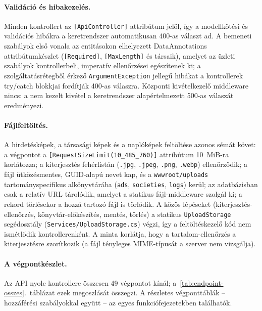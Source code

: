 \paragraph{Validáció és hibakezelés.} Minden kontrollert az \texttt{[ApiController]} attribútum
jelöl, így a modellkötési és validációs hibákra a keretrendszer automatikusan 400-as választ ad.
A bemeneti szabályok első vonala az entitásokon elhelyezett DataAnnotations attribútumkészlet
(\texttt{[Required]}, \texttt{[MaxLength]} és társaik), amelyet az üzleti szabályok
kontrollerbeli, imperatív ellenőrzései egészítenek ki; a szolgáltatásrétegből érkező
\texttt{ArgumentException} jellegű hibákat a kontrollerek try/catch blokkjai fordítják 400-as
válaszra. Központi kivételkezelő middleware nincs: a nem kezelt kivétel a keretrendszer
alapértelmezett 500-as válaszát eredményezi.

\paragraph{Fájlfeltöltés.} A hirdetésképek, a társasági képek és a naplóképek feltöltése azonos
sémát követ: a végpontot a \texttt{[RequestSizeLimit(10\_485\_760)]} attribútum 10~MiB-ra
korlátozza; a kiterjesztés fehérlistán (\texttt{.jpg}, \texttt{.jpeg}, \texttt{.png},
\texttt{.webp}) ellenőrződik; a fájl ütközésmentes, GUID-alapú nevet kap, és a
\texttt{wwwroot/uploads} tartományspecifikus alkönyvtárába (\texttt{ads}, \texttt{societies},
\texttt{logs}) kerül; az adatbázisban csak a relatív URL tárolódik, amelyet a statikus
fájl-middleware szolgál ki; a rekord törlésekor a hozzá tartozó fájl is törlődik. A közös
lépéseket (kiterjesztés-ellenőrzés, könyvtár-előkészítés, mentés, törlés) a statikus
\texttt{UploadStorage} segédosztály (\texttt{Services/UploadStorage.cs}) végzi, így a
feltöltéskezelő kód nem ismétlődik kontrollerenként. A minta
korlátja, hogy a tartalom-ellenőrzés a kiterjesztésre szorítkozik (a fájl tényleges MIME-típusát
a szerver nem vizsgálja).

\paragraph{A végpontkészlet.} Az API nyolc kontrollere összesen 49 végpontot kínál;
a~\ref{tab:endpoint-osszes}.~táblázat ezek megoszlását összegzi. A részletes végponttáblák --
hozzáférési szabályokkal együtt -- az egyes funkciófejezetekben találhatók.

